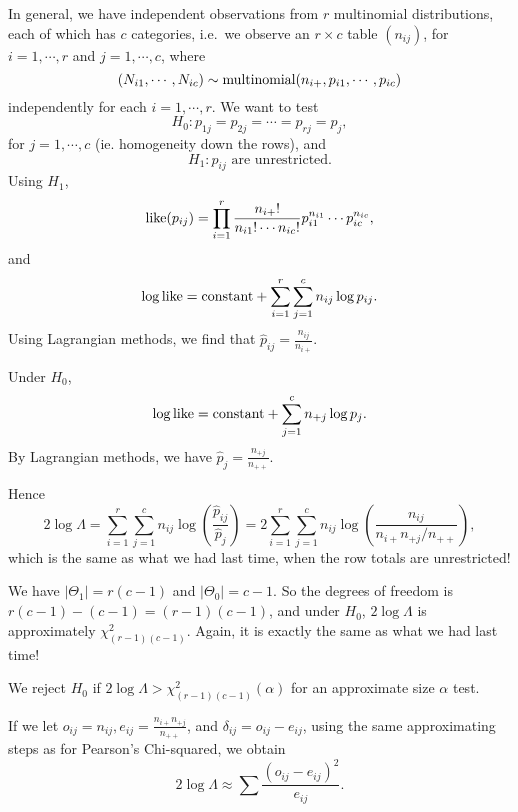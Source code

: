 \documentclass[a4paper]{article}
\begin{document}
In general, we have independent observations from $r$ multinomial distributions, each of which has $c$ categories, i.e.\ we observe an $r\times c$ table $(n_{ij})$, for $i = 1, \cdots, r$ and $j = 1, \cdots, c$, where
\[
(N_{i1}, \cdots, N_{ic}) \sim \operatorname{multinomial}(n_{i+}, p_{i1}, \cdots, p_{ic})
\]
independently for each $i = 1, \cdots, r$.
We want to test
\[
H_0: p_{1j} = p_{2j} = \cdots = p_{rj} = p_j,
\]
for $j = 1, \cdots, c$ (ie. homogeneity down the rows), and
\[
H_1: p_{ij}\text{ are unrestricted}.
\]
Using $H_1$,
\[
\operatorname{like}(p_{ij}) = \prod_{i = 1}^r \frac{n_{i+}!}{n_{i1}!\cdots n_{ic}!}p_{i1}^{n_{i1}} \cdots p_{ic}^{n_{ic}},
\]
and
\[
\log\operatorname{like} = \text{constant} + \sum_{i = 1}^r \sum_{j = 1}^c n_{ij}\log p_{ij}.
\]
Using Lagrangian methods, we find that $\hat{p}_{ij} = \frac{n_{ij}}{n_{i+}}$.

Under $H_0$,
\[
\log\operatorname{like} = \text{constant} + \sum_{j = 1}^c n_{+j}\log p_j.
\]
By Lagrangian methods, we have $\hat{p}_j = \frac{n_{+j}}{n_{++}}$.

Hence
\[
2\log \Lambda = \sum_{i = 1}^{r}\sum_{j = 1}^c n_{ij}\log\left(\frac{\hat{p}_{ij}}{\hat{p}_j}\right) = 2\sum_{i = 1}^r\sum_{j = 1}^c n_{ij}\log\left(\frac{n_{ij}}{n_{i+}n_{+j}/n_{++}}\right),
\]
which is the same as what we had last time, when the row totals are unrestricted!

We have $|\Theta_1| = r(c - 1)$ and $|\Theta_0| = c - 1$. So the degrees of freedom is $r(c - 1) - (c - 1) = (r - 1)(c - 1)$, and under $H_0$, $2\log\Lambda$ is approximately $\chi^2_{(r - 1)(c - 1)}$. Again, it is exactly the same as what we had last time!

We reject $H_0$ if $2\log \Lambda > \chi_{(r - 1)(c - 1)}^2 (\alpha)$ for an approximate size $\alpha$ test.

If we let $o_{ij}= n_{ij}, e_{ij} = \frac{n_{i+}n_{+j}}{n_{++}}$, and $\delta_{ij} = o_{ij} - e_{ij}$, using the same approximating steps as for Pearson's Chi-squared, we obtain
\[
2\log \Lambda \approx \sum \frac{(o_{ij} - e_{ij})^2}{e_{ij}}.
\]
\end{document}
